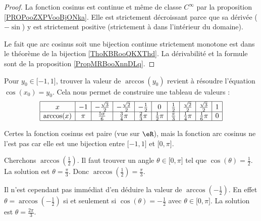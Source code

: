 \begin{proof}
    La fonction cosinus est continue et même de classe \(  C^{\infty}\) par la proposition \ref{PROPooZXPVooBjONka}. Elle est strictement décroissant parce que sa dérivée (\( -\sin\)) y est strictement positive (strictement à dans l'intérieur du domaine).

    Le fait que arc cosinus soit une bijection continue strictement monotone est dans le théorème de la bijection \ref{ThoKBRooQKXThd}. La dérivabilité et la formule sont de la proposition \ref{PropMRBooXnnDLq}.
\end{proof}

Pour \( y_0\in\mathopen[ -1 , 1 \mathclose]\), trouver la valeur de \( \arccos(y_0)\) revient à résoudre l'équation \( \cos(x_0)=y_0\). Cela nous permet de construire une tableau de valeurs :
\begin{equation*}
    \begin{array}[]{|c|c|c|c|c|c|c|c|c|c|}
        \hline
        x&-1&-\frac{ \sqrt{3} }{2}&-\frac{ \sqrt{2} }{2}&-\frac{ 1 }{2}&0&\frac{ 1 }{2}&\frac{ \sqrt{2} }{2}&\frac{ \sqrt{3} }{2}&1\\
          \hline
          \arccos(x)&\pi&\frac{ 5\pi }{ 6 }&\frac{ 3 }{ 4 }\pi&\frac{ 2 }{ 3 }\pi&\frac{ 1 }{2}\pi&\frac{ \pi }{ 3 }&\frac{1}{ 4 }\pi&\frac{1}{ 6 }\pi&0\\
          \hline 
           \end{array}
\end{equation*}

\begin{remark}
    Certes la fonction cosinus est paire (vue sur \( \eR\)), mais la fonction arc cosinus ne l'est pas car elle est une bijection entre \(\mathopen[ -1 , 1 \mathclose]\) et \(\mathopen[ 0 , \pi \mathclose]\).
\end{remark}

\begin{example}
    Cherchons \( \arccos(\frac{ 1 }{2})\). Il faut trouver un angle \( \theta\in\mathopen[ 0 , \pi \mathclose]\) tel que \( \cos(\theta)=\frac{ 1 }{2}\). La solution est \( \theta=\frac{ \pi }{ 3 }\). Donc \( \arccos(\frac{ 1 }{2})=\frac{ \pi }{ 3 }\).

    Il n'est cependant pas immédiat d'en déduire la valeur de \( \arccos(-\frac{ 1 }{2})\). En effet \( \theta=\arccos(-\frac{ 1 }{2})\) si et seulement si \( \cos(\theta)=-\frac{ 1 }{2}\) avec \( \theta\in\mathopen[ 0 , \pi \mathclose]\). La solution est \( \theta=\frac{ 2\pi }{ 3 }\).
\end{example}

